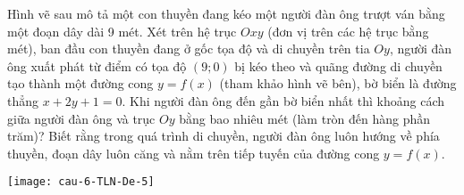 \begin{ex}%
	Hình vẽ sau mô tả một con thuyền đang kéo một người đàn ông trượt ván bằng một đoạn dây dài 9 mét. Xét trên hệ trục $Oxy$ (đơn vị trên các hệ trục bằng mét), ban đầu con thuyền đang ở gốc tọa độ và di chuyền trên tia $Oy$, người đàn ông xuất phát từ điểm có tọa độ $(9; 0)$ bị kéo theo và quãng đường di chuyền tạo thành một đường cong $y=f(x)$ (tham khảo hình vẽ bên), bờ biển là đường thẳng $x+2y+1=0$. Khi người đàn ông đến gần bờ biển nhất thì khoảng cách giữa người đàn ông và trục $Oy$ bằng bao nhiêu mét (làm tròn đến hàng phần trăm)? Biết rằng trong quá trình di chuyền, người đàn ông luôn hướng về phía thuyền, đoạn dây luôn căng và nằm trên tiếp tuyến của đường cong $y=f(x)$.
	\begin{center}
		\texttt{[image: cau-6-TLN-De-5]}
	\end{center}
	
\end{ex}

